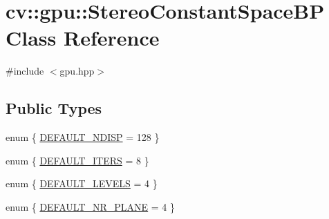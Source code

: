 \hypertarget{classcv_1_1gpu_1_1StereoConstantSpaceBP}{\section{cv\-:\-:gpu\-:\-:Stereo\-Constant\-Space\-B\-P Class Reference}
\label{classcv_1_1gpu_1_1StereoConstantSpaceBP}
}


{\ttfamily \#include $<$gpu.\-hpp$>$}

\subsection*{Public Types}
\begin{DoxyCompactItemize}
\item 
enum \{ \hyperlink{classcv_1_1gpu_1_1StereoConstantSpaceBP_a7bf57e9c04e48d598bd46cbeab61c082a6eb05da7034cd7d04a243a0bb7bf8588}{D\-E\-F\-A\-U\-L\-T\-\_\-\-N\-D\-I\-S\-P} = 128
 \}
\item 
enum \{ \hyperlink{classcv_1_1gpu_1_1StereoConstantSpaceBP_a2c56e0cd0c3b1796ba961e3c40ec7245ab9cddd75bf692fe83077b95498a930dd}{D\-E\-F\-A\-U\-L\-T\-\_\-\-I\-T\-E\-R\-S} = 8
 \}
\item 
enum \{ \hyperlink{classcv_1_1gpu_1_1StereoConstantSpaceBP_a3801d564151082f91f75cff48fa971d5adcc1c66dd82e68f97a02244894c932d8}{D\-E\-F\-A\-U\-L\-T\-\_\-\-L\-E\-V\-E\-L\-S} = 4
 \}
\item 
enum \{ \hyperlink{classcv_1_1gpu_1_1StereoConstantSpaceBP_a74b20af251e9607f410cdc6d7597c0dba22afcf495d8900e5bf3eb4d519643ade}{D\-E\-F\-A\-U\-L\-T\-\_\-\-N\-R\-\_\-\-P\-L\-A\-N\-E} = 4
 \}
\end{DoxyCompactItemize}
